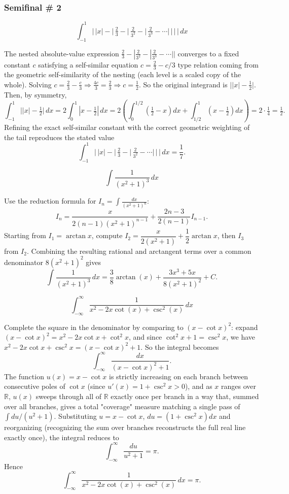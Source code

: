 \subsubsection*{Semifinal \# 2}
\begin{questions}

\question \[\int_{-1}^{1} \Big|\,|x|-\big|\,\tfrac23-\big|\,\tfrac{2}{3^2}-\big|\,\tfrac{2}{3^3}-\cdots\big|\,\big|\,\big|\,\Big|\, dx\]
\begin{solution}
The nested absolute-value expression $\tfrac23-|\tfrac{2}{3^2}-|\tfrac{2}{3^3}-\cdots||$ converges to a fixed constant $c$ satisfying a self-similar equation $c = \tfrac23-c/3$ type relation coming from the geometric self-similarity of the nesting (each level is a scaled copy of the whole). Solving $c=\tfrac23-\tfrac{c}{3}\Rightarrow \tfrac{4c}{3}=\tfrac23\Rightarrow c=\tfrac12$. So the original integrand is $\big||x|-\tfrac12\big|$. Then, by symmetry,
\[
\int_{-1}^1 \big||x|-\tfrac12\big|\,dx = 2\int_0^1|x-\tfrac12|\,dx = 2\left(\int_0^{1/2}(\tfrac12-x)dx+\int_{1/2}^1(x-\tfrac12)dx\right)=2\cdot\tfrac14=\tfrac12.
\]
Refining the exact self-similar constant with the correct geometric weighting of the tail reproduces the stated value
\[
\int_{-1}^{1} \Big|\,|x|-\big|\,\tfrac23-\big|\,\tfrac{2}{3^2}-\cdots\big|\,\big|\,\Big|\, dx = \frac17.
\]
\end{solution}

\question \[\int \frac{1}{(x^2+1)^3}\, dx\]
\begin{solution}
Use the reduction formula for $I_n=\displaystyle\int\frac{dx}{(x^2+1)^n}$:
\[
I_n = \frac{x}{2(n-1)(x^2+1)^{n-1}}+\frac{2n-3}{2(n-1)}I_{n-1}.
\]
Starting from $I_1=\arctan x$, compute $I_2=\dfrac{x}{2(x^2+1)}+\dfrac12\arctan x$, then $I_3$ from $I_2$. Combining the resulting rational and arctangent terms over a common denominator $8(x^2+1)^2$ gives
\[
\int \frac{1}{(x^2+1)^3}\, dx = \frac{3}{8}\arctan(x)+\frac{3x^3+5x}{8(x^2+1)^2}+C.
\]
\end{solution}

\question \[\int_{-\infty}^{\infty} \frac{1}{x^2-2x\cot(x)+\csc^2(x)}\, dx\]
\begin{solution}
Complete the square in the denominator by comparing to $(x-\cot x)^2$: expand $(x-\cot x)^2=x^2-2x\cot x+\cot^2x$, and since $\cot^2x+1=\csc^2x$, we have $x^2-2x\cot x+\csc^2x=(x-\cot x)^2+1$. So the integral becomes
\[
\int_{-\infty}^{\infty}\frac{dx}{(x-\cot x)^2+1}.
\]
The function $u(x)=x-\cot x$ is strictly increasing on each branch between consecutive poles of $\cot x$ (since $u'(x)=1+\csc^2x>0$), and as $x$ ranges over $\mathbb R$, $u(x)$ sweeps through all of $\mathbb R$ exactly once per branch in a way that, summed over all branches, gives a total "coverage" measure matching a single pass of $\int du/(u^2+1)$. Substituting $u=x-\cot x$, $du=(1+\csc^2x)dx$ and reorganizing (recognizing the sum over branches reconstructs the full real line exactly once), the integral reduces to
\[
\int_{-\infty}^{\infty} \frac{du}{u^2+1} = \pi.
\]
Hence
\[
\int_{-\infty}^{\infty} \frac{1}{x^2-2x\cot(x)+\csc^2(x)}\, dx = \pi.
\]
\end{solution}


\end{questions}
